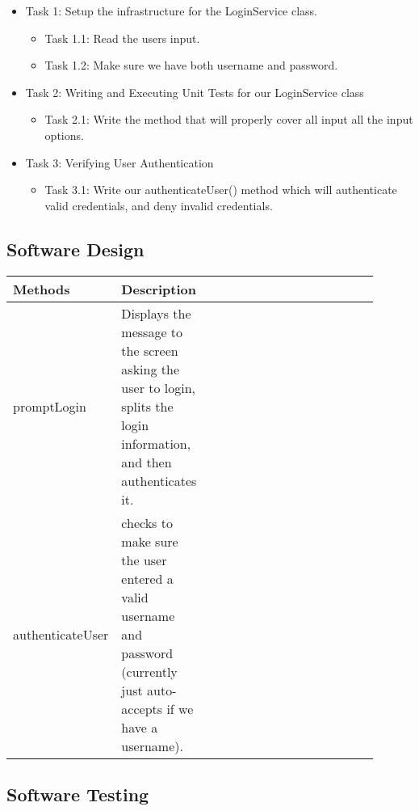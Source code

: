 \documentclass{scrreprt}
\begin{document}
\begin{itemize}
    \item Task 1: Setup the infrastructure for the LoginService class.
    \begin{itemize}
        \item Task 1.1: Read the users input.
        \item Task 1.2: Make sure we have both username and password.
    \end{itemize}
    \item Task 2: Writing and Executing Unit Tests for our LoginService class
    \begin{itemize}
        \item Task 2.1: Write the method that will properly cover all input all the input options.
    \end{itemize}
    \item Task 3: Verifying User Authentication
    \begin{itemize}
        \item Task 3.1: Write our authenticateUser() method which will authenticate valid credentials, and deny invalid credentials.
    \end{itemize}
\end{itemize}

% 
\subsection{Software Design}

\begin{table}[h!]
\begin{tabular}{|p{0.25\linewidth}
                |p{0.1\linewidth}
                |p{0.45\linewidth}
                |p{0.1\linewidth}|}
    \hline
    Methods & Description \\
    \hline
    promptLogin     &   Displays the message to the screen asking the user to login, splits the login information, and then authenticates it. \\
    \hline
    authenticateUser     &    checks to make sure the user entered a valid username and password (currently just auto-accepts if we have a username). \\
    \hline
\end{tabular}
\end{table}

\subsection{Software Testing}
\end{document}
